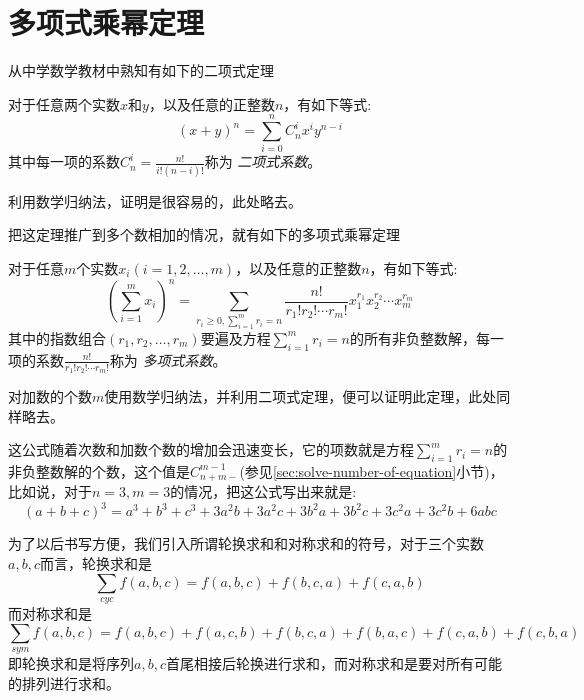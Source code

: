 
\section{多项式乘幂定理}
\label{sec:polynomial-power-theorem}

从中学数学教材中熟知有如下的二项式定理
\begin{theorem}[二项式定理]
  对于任意两个实数$x$和$y$，以及任意的正整数$n$，有如下等式:
  \begin{equation}
    \label{eq:binomial-theorem}
    (x+y)^n = \sum_{i=0}^n C_n^i x^iy^{n-i}
  \end{equation}
  其中每一项的系数$C_n^i=\frac{n!}{i!(n-i)!}$称为 \emph{二项式系数}。
\end{theorem}

利用数学归纳法，证明是很容易的，此处略去。

把这定理推广到多个数相加的情况，就有如下的多项式乘幂定理
\begin{theorem}[多项式乘幂定理]
  对于任意$m$个实数$x_i(i=1,2,\ldots,m)$，以及任意的正整数$n$，有如下等式:
  \begin{equation}
    \label{eq:polynomial-theorem}
    \left( \sum_{i=1}^m x_i \right)^n = \sum_{r_{i} \geqslant 0,\sum_{i=1}^{m}r_{i}=n} \frac{n!}{r_1!r_2!\cdots r_m!}x_1^{r_1}x_2^{r_2}\cdots x_m^{r_m}
  \end{equation}
  其中的指数组合$(r_1,r_2,\ldots,r_{m})$要遍及方程$\sum_{i=1}^{m}r_{i}=n$的所有非负整数解，每一项的系数$\frac{n!}{r_1!r_{2}!\cdots r_{m}!}$称为 \emph{多项式系数}。
\end{theorem}

对加数的个数$m$使用数学归纳法，并利用二项式定理，便可以证明此定理，此处同样略去。

这公式随着次数和加数个数的增加会迅速变长，它的项数就是方程$\sum_{i=1}^mr_i=n$的非负整数解的个数，这个值是$C_{n+m-}^{m-1}$(参见\ref{sec:solve-number-of-equation}小节)，比如说，对于$n=3,m=3$的情况，把这公式写出来就是:
\begin{equation*}
  (a+b+c)^3 = a^3+b^3+c^3+3a^2b+3a^2c+3b^2a+3b^2c+3c^2a+3c^2b+6abc
\end{equation*}

为了以后书写方便，我们引入所谓轮换求和和对称求和的符号，对于三个实数$a,b,c$而言，轮换求和是
\begin{equation*}
  \sum_{cyc} f(a,b,c) = f(a,b,c) + f(b, c, a) + f(c, a ,b)
\end{equation*}
而对称求和是
\begin{equation*}
  \sum_{sym} f(a,b,c) = f(a, b, c) + f(a, c, b) + f(b, c, a) + f(b, a, c) + f(c, a, b) + f(c, b, a)
\end{equation*}
即轮换求和是将序列$a,b,c$首尾相接后轮换进行求和，而对称求和是要对所有可能的排列进行求和。

